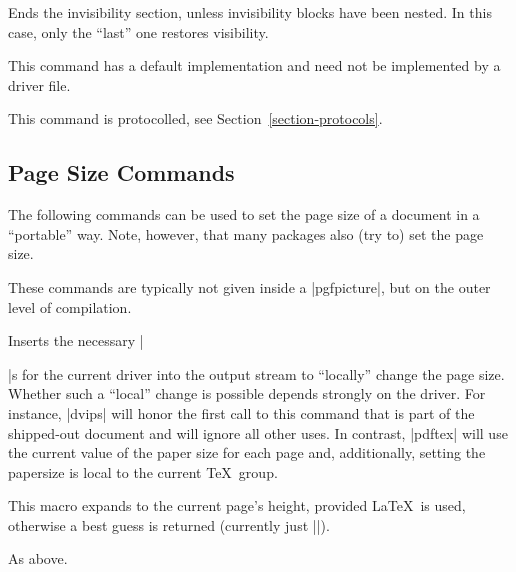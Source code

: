 \begin{command}{\pgfsys@endinvisible}
  Ends the invisibility section, unless invisibility blocks have been
  nested. In this case, only the ``last'' one restores visibility.

  This command has a default implementation and need not be
  implemented by a driver file.

  This command is protocolled, see Section~\ref{section-protocols}.
\end{command}



\subsection{Page Size Commands}

The following commands can be used to set the page size of a document
in a ``portable'' way. Note, however, that many packages also (try to)
set the page size.

These commands are typically not given inside a |{pgfpicture}|, but on
the outer level of compilation.

\begin{command}{\pgfsys@papersize{}}
  Inserts the necessary |\special|s for the current driver into the
  output stream to ``locally'' change the page size. Whether such a
  ``local'' change is possible depends strongly on the driver. For
  instance, |dvips| will honor the first call to this command that is
  part of the shipped-out document and will ignore all other uses. In
  contrast, |pdftex| will use the current value of the paper size for
  each page and, additionally, setting the papersize is local to the
  current \TeX\ group.
\end{command}


\begin{command}{\pgfsys@thepageheight}
  This macro expands to the current page's height, provided \LaTeX\ is
  used, otherwise a best guess is returned (currently just |\the\vsize|). 
\end{command}

\begin{command}{\pgfsys@thepagewidth}
  As above.
\end{command}

